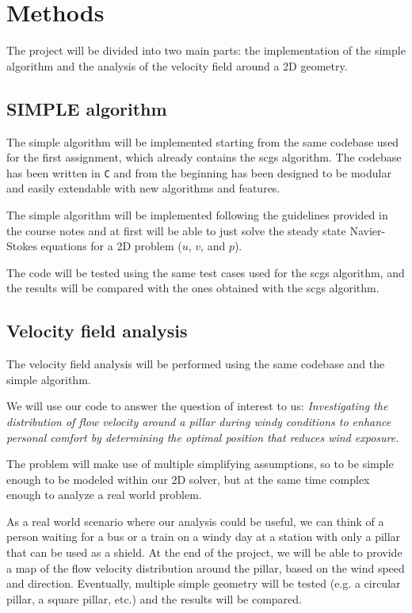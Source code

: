 \section{Methods}

The project will be divided into two main parts: the implementation of the \acrshort{simple} algorithm and the analysis of the velocity field around a 2D geometry.

\subsection{SIMPLE algorithm}

The \acrshort{simple} algorithm will be implemented starting from the same codebase used for the first assignment, which already contains the \acrshort{scgs} algorithm.
The codebase has been written in \texttt{C} and from the beginning has been designed to be modular and easily extendable with new algorithms and features.

The \acrshort{simple} algorithm will be implemented following the guidelines provided in the course notes and at first will be able to just solve the steady state Navier-Stokes equations for a 2D problem ($u$, $v$, and $p$).

The code will be tested using the same test cases used for the \acrshort{scgs} algorithm, and the results will be compared with the ones obtained with the \acrshort{scgs} algorithm.

\subsection{Velocity field analysis}

The velocity field analysis will be performed using the same codebase and the \acrshort{simple} algorithm.

We will use our code to answer the question of interest to us: \emph{Investigating the distribution of flow velocity around a pillar during windy conditions to enhance personal comfort by determining the optimal position that reduces wind exposure.}

The problem will make use of multiple simplifying assumptions, so to be simple enough to be modeled within our 2D solver, but at the same time complex enough to analyze a real world problem.

As a real world scenario where our analysis could be useful, we can think of a person waiting for a bus or a train on a windy day at a station with only a pillar that can be used as a shield.
At the end of the project, we will be able to provide a map of the flow velocity distribution around the pillar, based on the wind speed and direction.
Eventually, multiple simple geometry will be tested (e.g. a circular pillar, a square pillar, etc.) and the results will be compared.

